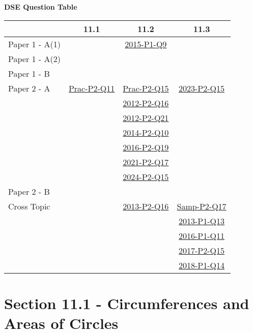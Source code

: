 \documentclass[12pt, a4paper]{article}
\begin{document}
\begin{absolutelynopagebreak}
\begin{center}
\textbf{DSE Question Table}
\end{center}
\begin{center}
\begin{tabular}{|l|c|c|c|}
\hline
        & 11.1 & 11.2 & 11.3 \\\hline
\hline
Paper 1 - A(1)&  & \hyperref[DSE2015-CoreP1-Q09]{2015-P1-Q9} &  \\
\hline
Paper 1 - A(2)&  &  &  \\
\hline
Paper 1 - B&  &  &  \\
\hline
\hline
Paper 2 - A& \hyperref[DSE2012P-CoreP2-Q11]{Prac-P2-Q11} & \hyperref[DSE2012P-CoreP2-Q15]{Prac-P2-Q15} & \hyperref[DSE2023-CoreP2-Q15]{2023-P2-Q15} \\
&  & \hyperref[DSE2012-CoreP2-Q16]{2012-P2-Q16} &  \\
&  & \hyperref[DSE2012-CoreP2-Q21]{2012-P2-Q21} &  \\
&  & \hyperref[DSE2014-CoreP2-Q10]{2014-P2-Q10} &  \\
&  & \hyperref[DSE2016-CoreP2-Q19]{2016-P2-Q19} &  \\
&  & \hyperref[DSE2021-CoreP2-Q17]{2021-P2-Q17} &  \\
&  & \hyperref[DSE2024-CoreP2-Q15]{2024-P2-Q15} &  \\
\hline
Paper 2 - B&  &  &  \\
\hline
\hline
Cross Topic&  & \hyperref[DSE2013-CoreP2-Q16]{2013-P2-Q16} & \hyperref[DSE2012S-CoreP2-Q17]{Samp-P2-Q17} \\
&  &  & \hyperref[DSE2013-CoreP1-Q13]{2013-P1-Q13} \\
&  &  & \hyperref[DSE2016-CoreP1-Q11]{2016-P1-Q11} \\
&  &  & \hyperref[DSE2017-CoreP2-Q15]{2017-P2-Q15} \\
&  &  & \hyperref[DSE2018-CoreP1-Q14]{2018-P1-Q14} \\
\hline
\end{tabular}
\end{center}
\end{absolutelynopagebreak}




\section*{Section 11.1 - Circumferences and Areas of Circles}\label{section:2-11-1}
\end{document}
